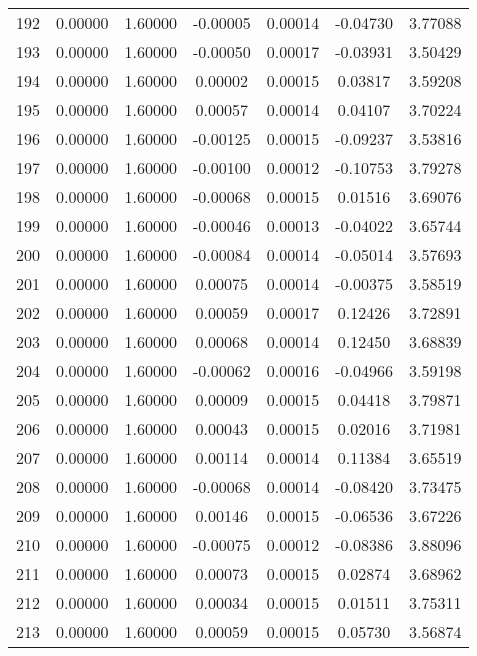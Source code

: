 \begin{longtable}{c c c c c c c}
192 &  0.00000 &      1.60000 & -0.00005 &   0.00014 &  -0.04730 &   3.77088 \\
193 &  0.00000 &      1.60000 & -0.00050 &   0.00017 &  -0.03931 &   3.50429 \\
194 &  0.00000 &      1.60000 &  0.00002 &   0.00015 &   0.03817 &   3.59208 \\
195 &  0.00000 &      1.60000 &  0.00057 &   0.00014 &   0.04107 &   3.70224 \\
196 &  0.00000 &      1.60000 & -0.00125 &   0.00015 &  -0.09237 &   3.53816 \\
197 &  0.00000 &      1.60000 & -0.00100 &   0.00012 &  -0.10753 &   3.79278 \\
198 &  0.00000 &      1.60000 & -0.00068 &   0.00015 &   0.01516 &   3.69076 \\
199 &  0.00000 &      1.60000 & -0.00046 &   0.00013 &  -0.04022 &   3.65744 \\
200 &  0.00000 &      1.60000 & -0.00084 &   0.00014 &  -0.05014 &   3.57693 \\
201 &  0.00000 &      1.60000 &  0.00075 &   0.00014 &  -0.00375 &   3.58519 \\
202 &  0.00000 &      1.60000 &  0.00059 &   0.00017 &   0.12426 &   3.72891 \\
203 &  0.00000 &      1.60000 &  0.00068 &   0.00014 &   0.12450 &   3.68839 \\
204 &  0.00000 &      1.60000 & -0.00062 &   0.00016 &  -0.04966 &   3.59198 \\
205 &  0.00000 &      1.60000 &  0.00009 &   0.00015 &   0.04418 &   3.79871 \\
206 &  0.00000 &      1.60000 &  0.00043 &   0.00015 &   0.02016 &   3.71981 \\
207 &  0.00000 &      1.60000 &  0.00114 &   0.00014 &   0.11384 &   3.65519 \\
208 &  0.00000 &      1.60000 & -0.00068 &   0.00014 &  -0.08420 &   3.73475 \\
209 &  0.00000 &      1.60000 &  0.00146 &   0.00015 &  -0.06536 &   3.67226 \\
210 &  0.00000 &      1.60000 & -0.00075 &   0.00012 &  -0.08386 &   3.88096 \\
211 &  0.00000 &      1.60000 &  0.00073 &   0.00015 &   0.02874 &   3.68962 \\
212 &  0.00000 &      1.60000 &  0.00034 &   0.00015 &   0.01511 &   3.75311 \\
213 &  0.00000 &      1.60000 &  0.00059 &   0.00015 &   0.05730 &   3.56874 \\

\end{longtable}
